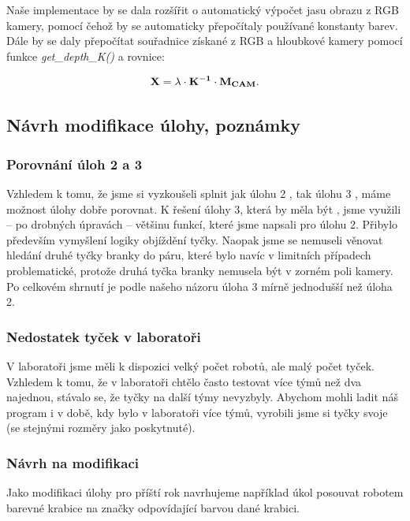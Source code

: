 \documentclass{article}
\begin{document}
 	Naše implementace by se dala rozšířit o automatický výpočet jasu obrazu z RGB kamery, pomocí čehož by se automaticky přepočítaly používané konstanty barev. Dále by se daly přepočítat souřadnice získané z RGB a hloubkové kamery pomocí funkce {\it get\_depth\_K()} a rovnice:

\begin{equation}
	{\bf X} = \lambda \cdot {\bf K^{-1}} \cdot {\bf M_{CAM}}.
\end{equation}
 	
 	

\subsection{Návrh modifikace úlohy, poznámky}

\subsubsection{Porovnání úloh 2 a 3}

	Vzhledem k tomu, že jsme si vyzkoušeli splnit jak úlohu 2 , tak úlohu 3 , máme možnost úlohy dobře porovnat. K řešení úlohy 3, která by měla být , jsme využili -- po drobných úpravách -- většinu funkcí, které jsme napsali pro úlohu 2. Přibylo především vymyšlení logiky objíždění tyčky. Naopak jsme se nemuseli věnovat hledání druhé tyčky branky do páru, které bylo navíc v limitních případech problematické, protože druhá tyčka branky nemusela být v zorném poli kamery. Po celkovém shrnutí je podle našeho názoru úloha 3 mírně jednodušší než úloha 2. 
	
\subsubsection{Nedostatek tyček v laboratoři}

	V laboratoři jsme měli k dispozici velký počet robotů, ale malý počet tyček. Vzhledem k tomu, že v laboratoři chtělo často testovat více týmů než dva najednou, stávalo se, že tyčky na další týmy nevyzbyly. Abychom mohli ladit náš program i v době, kdy bylo v laboratoři více týmů, vyrobili jsme si tyčky svoje (se stejnými rozměry jako poskytnuté). 

\subsubsection{Návrh na modifikaci}
	
	Jako modifikaci úlohy pro příští rok navrhujeme například úkol posouvat robotem barevné krabice na značky odpovídající barvou dané krabici. 
	
\end{document}
